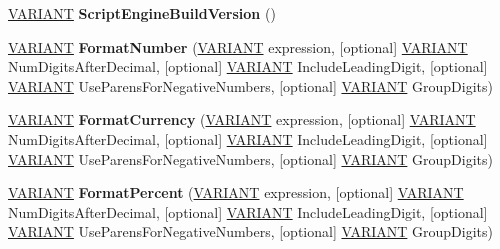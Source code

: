 \begin{DoxyCompactItemize}
\hyperlink{structtag_v_a_r_i_a_n_t}{V\+A\+R\+I\+A\+NT} {\bfseries Script\+Engine\+Build\+Version} ()
\item 
\mbox{\label{interface_v_b_script___global_1_1_global_obj_acd8a930e1605d55df9192b2217762e28}} 
\hyperlink{structtag_v_a_r_i_a_n_t}{V\+A\+R\+I\+A\+NT} {\bfseries Format\+Number} (\hyperlink{structtag_v_a_r_i_a_n_t}{V\+A\+R\+I\+A\+NT} expression, \mbox{[}optional\mbox{]} \hyperlink{structtag_v_a_r_i_a_n_t}{V\+A\+R\+I\+A\+NT} Num\+Digits\+After\+Decimal, \mbox{[}optional\mbox{]} \hyperlink{structtag_v_a_r_i_a_n_t}{V\+A\+R\+I\+A\+NT} Include\+Leading\+Digit, \mbox{[}optional\mbox{]} \hyperlink{structtag_v_a_r_i_a_n_t}{V\+A\+R\+I\+A\+NT} Use\+Parens\+For\+Negative\+Numbers, \mbox{[}optional\mbox{]} \hyperlink{structtag_v_a_r_i_a_n_t}{V\+A\+R\+I\+A\+NT} Group\+Digits)
\item 
\mbox{\label{interface_v_b_script___global_1_1_global_obj_a41fca3b239a0fae18db49f394b97d8cf}} 
\hyperlink{structtag_v_a_r_i_a_n_t}{V\+A\+R\+I\+A\+NT} {\bfseries Format\+Currency} (\hyperlink{structtag_v_a_r_i_a_n_t}{V\+A\+R\+I\+A\+NT} expression, \mbox{[}optional\mbox{]} \hyperlink{structtag_v_a_r_i_a_n_t}{V\+A\+R\+I\+A\+NT} Num\+Digits\+After\+Decimal, \mbox{[}optional\mbox{]} \hyperlink{structtag_v_a_r_i_a_n_t}{V\+A\+R\+I\+A\+NT} Include\+Leading\+Digit, \mbox{[}optional\mbox{]} \hyperlink{structtag_v_a_r_i_a_n_t}{V\+A\+R\+I\+A\+NT} Use\+Parens\+For\+Negative\+Numbers, \mbox{[}optional\mbox{]} \hyperlink{structtag_v_a_r_i_a_n_t}{V\+A\+R\+I\+A\+NT} Group\+Digits)
\item 
\mbox{\label{interface_v_b_script___global_1_1_global_obj_a33e8bf296dcc704e48a82b65031d1078}} 
\hyperlink{structtag_v_a_r_i_a_n_t}{V\+A\+R\+I\+A\+NT} {\bfseries Format\+Percent} (\hyperlink{structtag_v_a_r_i_a_n_t}{V\+A\+R\+I\+A\+NT} expression, \mbox{[}optional\mbox{]} \hyperlink{structtag_v_a_r_i_a_n_t}{V\+A\+R\+I\+A\+NT} Num\+Digits\+After\+Decimal, \mbox{[}optional\mbox{]} \hyperlink{structtag_v_a_r_i_a_n_t}{V\+A\+R\+I\+A\+NT} Include\+Leading\+Digit, \mbox{[}optional\mbox{]} \hyperlink{structtag_v_a_r_i_a_n_t}{V\+A\+R\+I\+A\+NT} Use\+Parens\+For\+Negative\+Numbers, \mbox{[}optional\mbox{]} \hyperlink{structtag_v_a_r_i_a_n_t}{V\+A\+R\+I\+A\+NT} Group\+Digits)
\item 
\mbox{\label{interface_v_b_script___global_1_1_global_obj_af570656320eb8f0c2b515c9c5ea6b701}} 

\end{DoxyCompactItemize}
